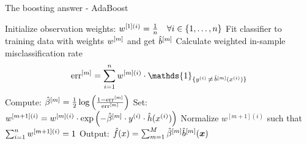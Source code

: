 \begin{vbframe}{The boosting answer - AdaBoost}
% 


\framebreak

\begin{algorithm}[H]
  \begin{algorithmic}[1]
    \State Initialize observation weights: $w^{[1](i)} = \frac{1}{n} \quad \forall i \in \{1, \ldots, n\}$
      \State Fit classifier to training data with weights $w^{[m]}$ and get $\hat{b}^{[m]}$
      \State Calculate weighted in-sample misclassification rate
      $$
        \errm = \sumin \wmi \cdot \mathds{1}_{\{\yi \,\neq\, \blh(\xi)\}}
      $$
      \State Compute: $ \hat{\beta}^{[m]} = \frac{1}{2} \log \left( \frac{1 - \text{err}^{[m]}}{\text{err}^{[m]}}\right)$
      \State Set: $w^{[m+1](i)} = w^{[m](i)} \cdot \exp\left(- \hat{\beta}^{[m]} \cdot
        y^{(i)} \cdot \hat{h}(x^{(i)})\right) $
      \State Normalize $w^{[m+1](i)}$ such that $\sum_{i=1}^n w^{[m+1](i)} = 1$
    \EndFor
    \State Output: $\hat{f}(x) = \sum_{m=1}^{M} \hat{\beta}^{[m]} \hat{b}^{[m]}(\bm{x})$
  \end{algorithmic}
  \caption{AdaBoost}
\end{algorithm}

\end{vbframe}


